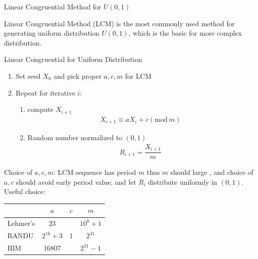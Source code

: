 \begin{point}
    Linear Congruential Method for $ U(0,1) $
\end{point}

    Linear Congruential Method (LCM) is the most commonly used method for generating uniform distribution $ U(0,1) $, which is the basic for more complex distribution. 


\begin{algorithm}{Linear Congruential for Uniform Distribution}
    
\begin{enumerate}[topsep=2pt,itemsep=2pt]
    \item Set seed $ X_0 $ and pick proper $ a,c,m $ for LCM
    \item Repeat for iterative $ i $:
    \begin{enumerate}[topsep=2pt,itemsep=2pt]
        \item compute $ X_{i+1} $
\begin{align}
    X_{i+1}\equiv aX_i+c(\mathrm{mod}\,m )
\end{align}
    \item Random number normalized to $ (0,1) $
    \begin{align}
        R_{i+1}=\dfrac{X_{i+1}}{m} 
    \end{align}
    \end{enumerate}
\end{enumerate}
\end{algorithm}
    
    


    Choice of $ a,c,m $: LCM sequence has period $ m $ thus $ m $ should large , and choice of $ a,c $ should avoid early period value, and let $ R_i $ distribute uniformly in $ (0,1) $. Useful choice:
        \begin{table}[H]
            \centering
            \renewcommand\arraystretch{1.15}
            \begin{tabular}{lccc}
                \hline
                &$ a $&$ c $&$ m $\\
                \hline
                Lehmer's&$ 23 $&&$ 10^8+1 $\\
                RANDU&$ 2^{16}+3 $&$ 1 $&$ 2^{31} $\\
                IBM&$ 16807 $&&$ 2^{31}-1 $\\
                \hline
            \end{tabular}
            \label{}
        \end{table}
        

